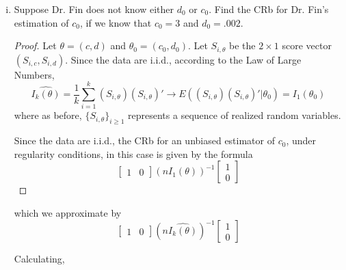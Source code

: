 \documentclass[letterpaper, 12pt]{article}\usepackage[]{graphicx}\usepackage[]{color}
\makeatletter
\newcommand{\hlnum}[1]{\textcolor[rgb]{0.686,0.059,0.569}{#1}}%
\newcommand{\hlopt}[1]{\textcolor[rgb]{0,0,0}{#1}}%
\newcommand{\hlstd}[1]{\textcolor[rgb]{0.345,0.345,0.345}{#1}}%
\newcommand{\hlkwb}[1]{\textcolor[rgb]{0.69,0.353,0.396}{#1}}%
\newcommand{\hlkwd}[1]{\textcolor[rgb]{0.737,0.353,0.396}{\textbf{#1}}}%
\newenvironment{kframe}{%
 \def\at@end@of@kframe{}%
 \ifinner\ifhmode%
  \def\at@end@of@kframe{\end{minipage}}%
  \begin{minipage}{\columnwidth}%
 \fi\fi%
 \def\FrameCommand##1{\hskip\@totalleftmargin \hskip-\fboxsep
 \colorbox{shadecolor}{##1}\hskip-\fboxsep
     \hskip-\linewidth \hskip-\@totalleftmargin \hskip\columnwidth}%
 \MakeFramed {\advance\hsize-\width
   \@totalleftmargin\z@ \linewidth\hsize
   \@setminipage}}%
 {\par\unskip\endMakeFramed%
 \at@end@of@kframe}
\newenvironment{knitrout}{}{} %
\makeatother
\begin{document}
\begin{enumerate}[(i)]
\begin{proof}
\begin{knitrout}
\begin{kframe}
\begin{alltt}
\hlstd{info1} \hlkwb{<-} \hlkwd{info_c}\hlstd{(x, c, d)}
\hlstd{info1}
\end{alltt}
\begin{verbatim}
## [1] 5.146
\end{verbatim}
\begin{alltt}
\hlstd{crb1_c} \hlkwb{<-} \hlstd{info1}\hlopt{^}\hlstd{(}\hlopt{-}\hlnum{1}\hlstd{)}
\hlstd{crb1_c}
\end{alltt}
\begin{verbatim}
## [1] 0.1943
\end{verbatim}
\end{kframe}
\end{knitrout}


Hence the approximation of the CRb $I_1(c_0)$ is 
\[
(n\widehat{I_k(c_0)})^{-1} = \frac{0.1943}{n}
\]
\end{proof}

\item
Suppose Dr. Fin does not know either $d_0$ or $c_0$. Find the CRb for Dr. Fin’s estimation of $c_0$, if we know
that $c_0 = 3$ and $d_0 = .002$.

\begin{proof}
Let $\theta = (c, d)$ and $\theta_0 = (c_0, d_0)$. Let $S_{i,\theta}$ be the $2 \times 1$ score vector $(S_{i,c}, S_{i,d})$. Since the data are i.i.d., according to the Law of Large Numbers,
\[
\widehat{I_k(\theta)} = \frac{1}{k}\sum_{i=1}^k (S_{i,\theta}) (S_{i, \theta})' \to E((S_{i,\theta}) (S_{i,\theta})'|\theta_0) = I_1(\theta_0)
\]
where as before, $\{S_{i,\theta}\}_{i \geq 1}$ represents a sequence of realized random variables.

Since the data are i.i.d., the CRb for an unbiased estimator of $c_0$, under regularity conditions, in this case is given by the formula
\[
\begin{bmatrix}
1 & 0
\end{bmatrix}
(nI_1(\theta))^{-1}
\begin{bmatrix}
1 \\ 0
\end{bmatrix}
\]
\end{proof}
which we approximate by
\[
\begin{bmatrix}
1 & 0
\end{bmatrix}
(n\widehat{I_k(\theta)})^{-1}
\begin{bmatrix}
1 \\ 0
\end{bmatrix}
\]

Calculating,


\end{enumerate}
\end{document}
